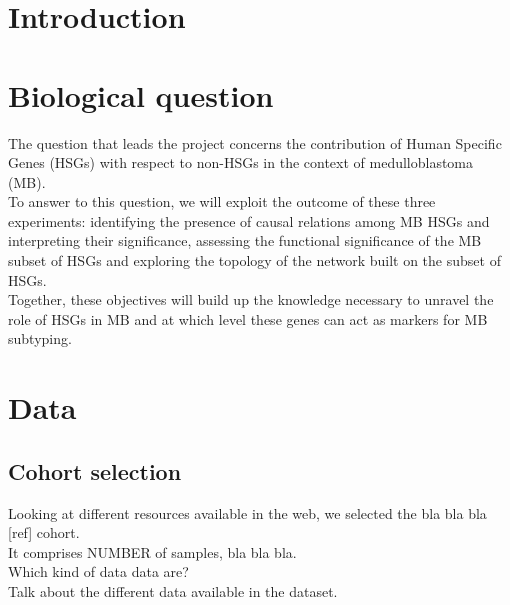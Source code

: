 \documentclass[10pt]{SelfArx} %
\affiliation{\textsuperscript{1}\textit{}} %
\affiliation{\textsuperscript{2}\textit{}} %
\affiliation{\textsuperscript{3}\textit{}} %
\affiliation{\textsuperscript{4}\textit{}} %
\affiliation{\textsuperscript{5}\textit{}} %
\begin{document}
\maketitle %



\section*{Introduction}\label{sec:introduction}

\section{Biological question}\label{sec:biological_question}
The question that leads the project concerns the contribution of Human Specific Genes (HSGs) with respect to non-HSGs in the context of medulloblastoma (MB). \\
To answer to this question, we will exploit the outcome of these three experiments: identifying the presence of causal relations among MB HSGs and interpreting their significance, assessing the functional significance of the MB subset of HSGs and exploring the topology of the network built on the subset of HSGs. \\
Together, these objectives will build up the knowledge necessary to unravel the role of HSGs in MB and at which level these genes can act as markers for MB subtyping. 


\section{Data}\label{sec:data}

\subsection{Cohort selection}\label{sec:cohort_selection}
Looking at different resources available in the web, we selected the bla bla bla [ref] cohort. \\
It comprises NUMBER of samples, bla bla bla. \\
Which kind of data data are?\\
Talk about the different data available in the dataset. 
\end{document}
